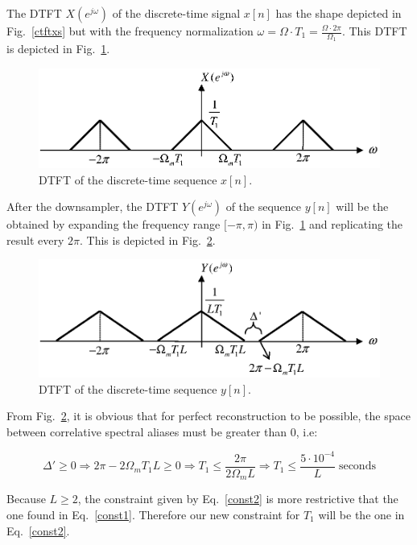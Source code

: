 \documentclass[a4paper,11pt,oneside]{article}
\begin{document}
The DTFT $X(e^{j\omega})$ of the discrete-time signal $x[n]$ has the shape depicted in Fig.~\ref{ctftxs} but with the frequency normalization $\omega=\Omega\cdot T_1=\frac{\Omega\cdot 2\pi}{\Omega_1}$. This DTFT is depicted in Fig.~\ref{dtftx}.

\begin{figure}[h!]
\centering
\includegraphics[width=.8\textwidth]{dtftx.eps}
\caption{DTFT of the discrete-time sequence $x[n]$.}
\label{dtftx}
\end{figure}

After the downsampler, the DTFT $Y(e^{j\omega})$ of the sequence $y[n]$ will be the obtained by expanding the frequency range $[-\pi,\pi)$ in Fig.~\ref{dtftx} and replicating the result every $2\pi$. This is depicted in Fig.~\ref{dtfty}.


\begin{figure}[h!]
\centering
\includegraphics[width=.8\textwidth]{dtfty.eps}
\caption{DTFT of the discrete-time sequence $y[n]$.}
\label{dtfty}
\end{figure}

From Fig.~\ref{dtfty}, it is obvious that for perfect reconstruction to be possible, the space between correlative spectral aliases must be greater than 0, i.e:

\begin{equation}\label{const2}
\Delta'\geq 0 \Rightarrow 2\pi-2\Omega_mT_1L\geq 0 \Rightarrow T_1 \leq \frac{2\pi}{2\Omega_m L} \Rightarrow T_{1} \leq \frac{5\cdot 10^{-4}}{L} \; \textrm{seconds}
\end{equation}

Because $L\geq 2$, the constraint given by Eq.~\ref{const2} is more restrictive that the one found in Eq.~\ref{const1}. Therefore our new constraint for $T_1$ will be the one in Eq.~\ref{const2}.
\end{document}
